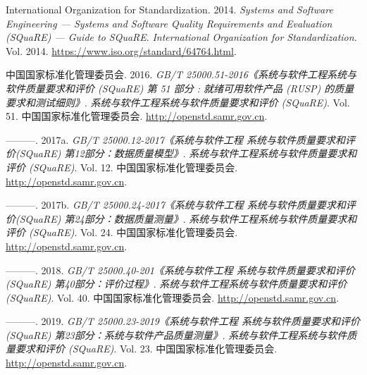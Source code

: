 \documentclass[hyperref, a4paper]{ctexart}
\begin{document}
\hypertarget{refs}{}
\leavevmode\hypertarget{ref-innovativeInternationalisation}{}%
International Organization for Standardization. 2014. \emph{Systems and
Software Engineering --- Systems and Software Quality Requirements and
Evaluation (SQuaRE) --- Guide to SQuaRE}. \emph{International
Organization for Standardization}. Vol. 2014.
\url{https://www.iso.org/standard/64764.html}.

\leavevmode\hypertarget{ref-innovative1}{}%
中国国家标准化管理委员会. 2016. \emph{GB/T
25000.51-2016《系统与软件工程系统与软件质量要求和评价 (SQuaRE) 第 51
部分 : 就绪可用软件产品 (RUSP) 的质量要求和测试细则》}.
\emph{系统与软件工程系统与软件质量要求和评价 (SQuaRE)}. Vol. 51.
中国国家标准化管理委员会. \url{http://openstd.samr.gov.cn}.

\leavevmode\hypertarget{ref-innovative3}{}%
---------. 2017a. \emph{GB/T 25000.12-2017《系统与软件工程
系统与软件质量要求和评价(SQuaRE) 第12部分：数据质量模型》}.
\emph{系统与软件工程系统与软件质量要求和评价 (SQuaRE)}. Vol. 12.
中国国家标准化管理委员会. \url{http://openstd.samr.gov.cn}.

\leavevmode\hypertarget{ref-innovative4}{}%
---------. 2017b. \emph{GB/T 25000.24-2017《系统与软件工程
系统与软件质量要求和评价(SQuaRE) 第24部分：数据质量测量》}.
\emph{系统与软件工程系统与软件质量要求和评价 (SQuaRE)}. Vol. 24.
中国国家标准化管理委员会. \url{http://openstd.samr.gov.cn}.

\leavevmode\hypertarget{ref-innovative5}{}%
---------. 2018. \emph{GB/T 25000.40-201《系统与软件工程
系统与软件质量要求和评价(SQuaRE) 第40部分：评价过程》}.
\emph{系统与软件工程系统与软件质量要求和评价 (SQuaRE)}. Vol. 40.
中国国家标准化管理委员会. \url{http://openstd.samr.gov.cn}.

\leavevmode\hypertarget{ref-innovative2}{}%
---------. 2019. \emph{GB/T 25000.23-2019《系统与软件工程
系统与软件质量要求和评价(SQuaRE) 第23部分：系统与软件产品质量测量》}.
\emph{系统与软件工程系统与软件质量要求和评价 (SQuaRE)}. Vol. 23.
中国国家标准化管理委员会. \url{http://openstd.samr.gov.cn}.
\end{document}
